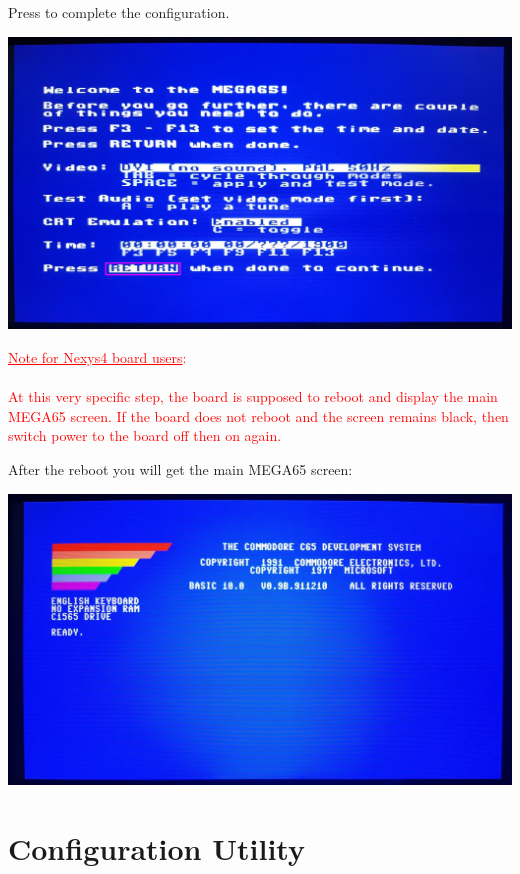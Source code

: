 Press  to complete the configuration.

\begin{center}
  \includegraphics[width=\linewidth]{images/img011_final_boot_05.png}
\end{center}

\textcolor{red}{\underline{Note for Nexys4 board users}: \\
\\
  At this very specific step, the board is supposed to reboot and display the main MEGA65 screen. If the board does not reboot and the screen remains black, then switch power to the board off then on again.}

After the reboot you will get the main MEGA65 screen:

\begin{center}
  \includegraphics[width=\linewidth]{images/img011_final_boot_06.jpg}
\end{center}

\section{Configuration Utility}

